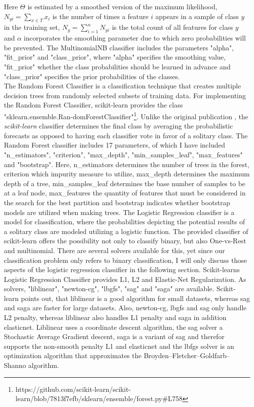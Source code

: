 \documentclass[a4paper, 11pt,titlepage,oneside,openany]{book}
\begin{document}
\noindent Here $\Theta$ is estimated by a smoothed version of the maximum likelihood, $N_{yi}=\sum_{x \in T}x_i$ is the number of times a feature $i$ appears in a sample of class $y$ in the training set, $N_y=\sum_{i=1}^{n}N_{yi}$ is the total count of all features for class $y$ and $\alpha$ incorporates the smoothing parameter due to which zero probabilities will be prevented.
The MultinomialNB classifier includes the parameters "alpha", "fit\_prior" and "class\_prior", where "alpha" specifies the smoothing value, "fit\_prior" whether the class probabilities should be learned in advance and "class\_prior" specifies the prior probabilities of the classes.\\

\indent The Random Forest Classifier is a classification technique that creates multiple decision trees from randomly selected subsets of training data. For implementing the Random Forest Classifier, scikit-learn provides the class "sklearn.ensemble.Ran-domForestClassifier"\footnote{https://github.com/scikit-learn/scikit-learn/blob/7813f7efb/sklearn/ensemble/forest.py\#L758}. Unlike the original publication \cite{randomforest}, the \textit{scikit-learn} classifier determines the final class by averaging the probabilistic forecasts as opposed to having each classifier vote in favor of a solitary class. The Random Forest classifier includes 17 parameters, of which I have included "n\_estimators", "criterion", "max\_depth", "min\_samples\_leaf", "max\_features" and "bootstrap". Here, n\_estimators determines the number of trees in the forest, criterion which impurity measure to utilize, max\_depth determines the maximum depth of a tree, min\_samples\_leaf determines the base number of samples to be at a leaf node, max\_features the quantity of features that must be considered in the search for the best partition and bootstrap indicates whether bootstrap models are utilized when making trees.
\newpage
\indent The Logistic Regression classifier is a model for classification, where the probabilities depicting the potential results of a solitary class are modeled utilizing a logistic function. The provided classifier of scikit-learn offers the possibility not only to classify binary, but also One-vs-Rest and multinomial. There are several solvers available for this, yet since our classification problem only refers to binary classification, I will only discuss those aspects of the logistic regression classifier in the following section. Scikit-learns Logistic Regression Classifier provides L1, L2 and Elastic-Net Regularization. As solvers, "liblinear", "newton-cg", "lbgfs", "sag" and "saga" are available. Scikit-learn points out, that liblinear is a good algorithm for small datasets, whereas sag and saga are faster for large datasets. 
Also, newton-cg, lbgfs and sag only handle L2 penalty, whereas liblinear also handles L1 penalty and saga in addition elasticnet. Liblinear uses a coordinate descent algorithm, the sag solver a Stochastic Average Gradient descent, saga is a variant of sag and therefor supports the non-smooth penalty L1 and elasticnet and the lbfgs solver is an optimization algorithm that approximates the Broyden–Fletcher–Goldfarb–Shanno algorithm.\\
\end{document}
